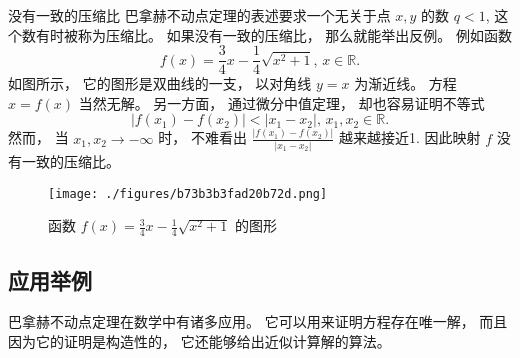 \begin{example}{没有一致的压缩比}
巴拿赫不动点定理的表述要求一个无关于点 $x,y$ 的数 $q<1$, 这个数有时被称为压缩比。 如果没有一致的压缩比， 那么就能举出反例。 例如函数
$$
f(x)=\frac{3}{4}x-\frac{1}{4}\sqrt{x^2+1},\,x\in\mathbb{R}.
$$
如图所示， 它的图形是双曲线的一支， 以对角线 $y=x$ 为渐近线。 方程 $x=f(x)$ 当然无解。 另一方面， 通过微分中值定理， 却也容易证明不等式
$$
|f(x_1)-f(x_2)|<|x_1-x_2|,\,x_1,x_2\in\mathbb{R}.
$$
然而， 当 $x_1,x_2\to-\infty$ 时， 不难看出 $\frac{|f(x_1)-f(x_2)|}{|x_1-x_2|}$ 越来越接近1. 因此映射 $f$ 没有一致的压缩比。 
\begin{figure}[ht]
\centering
\texttt{[image: ./figures/b73b3b3fad20b72d.png]}
\caption{函数 $f(x)=\frac{3}{4}x-\frac{1}{4}\sqrt{x^2+1}$ 的图形} \label{fig_ConMap_2}
\end{figure}

\end{example}

\subsection{应用举例}
巴拿赫不动点定理在数学中有诸多应用。 它可以用来证明方程存在唯一解， 而且因为它的证明是构造性的， 它还能够给出近似计算解的算法。

